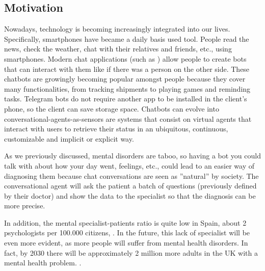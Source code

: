 \documentclass[12pt,english]{article}
\begin{document}
\subsection{Motivation}

Nowadays, technology is becoming increasingly integrated into our lives. Specifically, smartphones have became a daily basis used tool. People read the news, check the weather, chat with their relatives and friends, etc., using smartphones. Modern chat applications (such as \cite{Telegram}) allow people to create bots that can interact with them like if there was a person on the other side. These chatbots are growingly becoming popular amongst people because they cover many functionalities, from tracking shipments to playing games and reminding tasks. Telegram bots do not require another app to be installed in the client's phone, so the client can save storage space. Chatbots can evolve into conversational-agents-as-sensors are systems that consist on virtual agents that interact with users to retrieve their status in an ubiquitous, continuous, customizable and implicit or explicit way.

As we previously discussed, mental disorders are taboo, so having a bot you could talk with about how your day went, feelings, etc., could lead to an easier way of diagnosing them because chat conversations are seen as ''natural'' by society. The conversational agent will ask the patient a batch of questions (previously defined by their doctor) and show the data to the specialist so that the diagnosis can be more precise.

In addition, the mental specialist-patients ratio is quite low in Spain, about 2 psychologists per 100.000 citizens, \cite{elmundo}. In the future, this lack of specialist will be even more evident, as more people will suffer from mental health disorders. In fact, by 2030 there will be approximately 2 million more adults in the UK with a mental health problem. \cite{nhs}.
\end{document}

